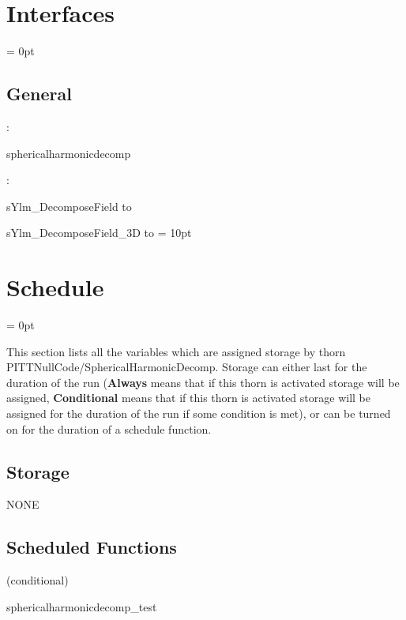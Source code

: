 \section{Interfaces} 


\parskip = 0pt

\vspace{3mm} \subsection*{General}

: 

sphericalharmonicdecomp
\vspace{2mm}

\vspace{5mm}

: 



sYlm\_DecomposeField to 

sYlm\_DecomposeField\_3D to 
\vspace{2mm}\parskip = 10pt 

\section{Schedule} 


\parskip = 0pt


\noindent This section lists all the variables which are assigned storage by thorn PITTNullCode/SphericalHarmonicDecomp.  Storage can either last for the duration of the run ({\bf Always} means that if this thorn is activated storage will be assigned, {\bf Conditional} means that if this thorn is activated storage will be assigned for the duration of the run if some condition is met), or can be turned on for the duration of a schedule function.


\subsection*{Storage}NONE
\subsection*{Scheduled Functions}
\vspace{5mm}

   (conditional) 

\hspace{5mm} sphericalharmonicdecomp\_test 

